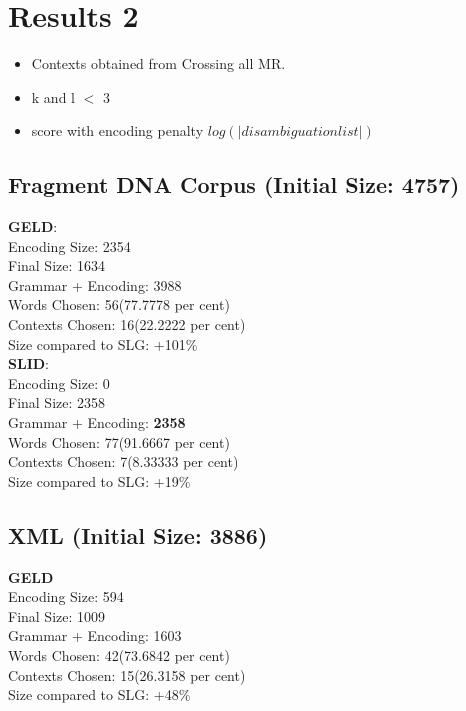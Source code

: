 \newpage
\section{Results 2}

\begin{itemize}
	\item Contexts obtained from Crossing all MR.
	\item k and l $<$ 3
	\item score with encoding penalty $log(|disambiguation list|)$
\end{itemize}

\subsection{Fragment DNA Corpus (Initial Size: 4757) }
\textbf{GELD}:\\
Encoding Size: 2354 \\
Final Size: 1634 \\
Grammar + Encoding: 3988 \\
Words Chosen: 56(77.7778 per cent) \\
Contexts Chosen: 16(22.2222 per cent) \\
Size compared to SLG:  +101\% \\

\textbf{SLID}: \\
Encoding Size: 0 \\
Final Size: 2358 \\
Grammar + Encoding: \textbf{2358} \\
Words Chosen: 77(91.6667 per cent) \\
Contexts Chosen: 7(8.33333 per cent)\\
Size compared to SLG:  +19\% \\


\subsection{XML (Initial Size: 3886)} 
\textbf{GELD}\\
Encoding Size: 594 \\
Final Size: 1009 \\
Grammar + Encoding: 1603 \\
Words Chosen: 42(73.6842 per cent) \\
Contexts Chosen: 15(26.3158 per cent) \\
Size compared to SLG:  +48\% \\

